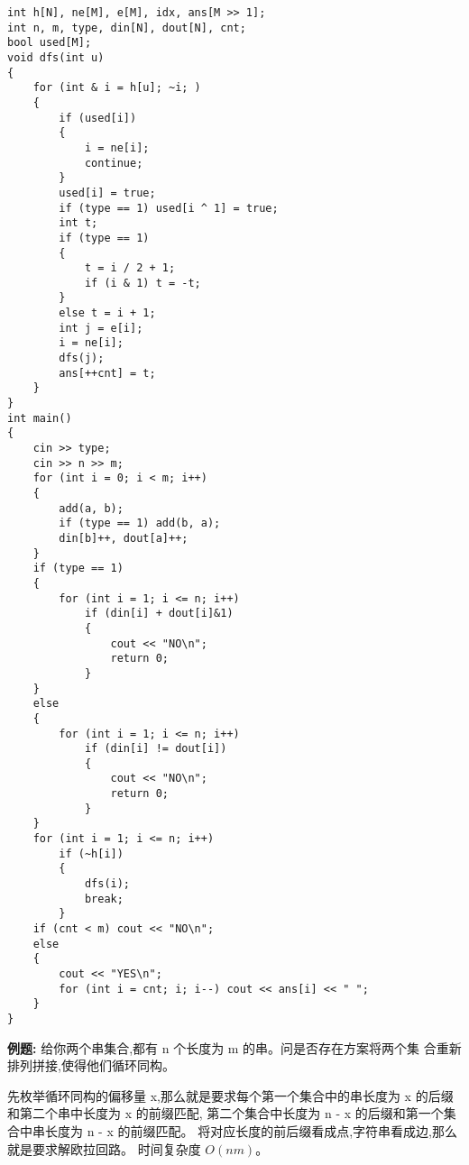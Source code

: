\documentclass[a4paper,fontset=none]{ctexart}
\begin{document}
\begin{verbatim}
int h[N], ne[M], e[M], idx, ans[M >> 1];
int n, m, type, din[N], dout[N], cnt;
bool used[M];
void dfs(int u)
{
    for (int & i = h[u]; ~i; )
    {
        if (used[i])
        {
            i = ne[i];
            continue;
        }
        used[i] = true;
        if (type == 1) used[i ^ 1] = true;
        int t;
        if (type == 1)
        {
            t = i / 2 + 1;
            if (i & 1) t = -t;
        }
        else t = i + 1;
        int j = e[i];
        i = ne[i];
        dfs(j);
        ans[++cnt] = t;
    }
}
int main()
{
    cin >> type;
    cin >> n >> m;
    for (int i = 0; i < m; i++)
    {
        add(a, b);
        if (type == 1) add(b, a);
        din[b]++, dout[a]++;
    }
    if (type == 1)
    {
        for (int i = 1; i <= n; i++)
            if (din[i] + dout[i]&1)
            {
                cout << "NO\n";
                return 0;
            }
    }
    else
    {
        for (int i = 1; i <= n; i++)
            if (din[i] != dout[i])
            {
                cout << "NO\n";
                return 0;
            }
    }
    for (int i = 1; i <= n; i++)
        if (~h[i])
        {
            dfs(i);
            break;
        }
    if (cnt < m) cout << "NO\n";
    else
    {
        cout << "YES\n";
        for (int i = cnt; i; i--) cout << ans[i] << " ";
    }
}
\end{verbatim}

\textbf{例题:} 给你两个串集合,都有 n 个长度为 m 的串。问是否存在方案将两个集
合重新排列拼接,使得他们循环同构。

先枚举循环同构的偏移量 x,那么就是要求每个第一个集合中的串长度为 x 的后缀和第二个串中长度为 x 的前缀匹配,
第二个集合中长度为 n - x 的后缀和第一个集合中串长度为 n - x 的前缀匹配。
将对应长度的前后缀看成点,字符串看成边,那么就是要求解欧拉回路。
时间复杂度 $O(nm)$。
\end{document}
